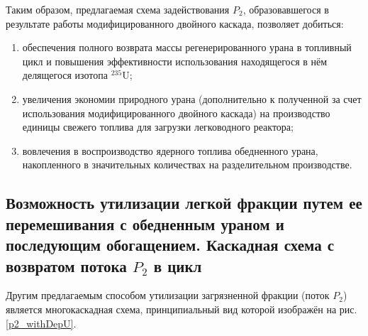 


Таким образом, предлагаемая схема задействования $P_2$, образовавшегося в результате работы модифицированного двойного каскада, позволяет добиться:
\begin{enumerate}
  \item обеспечения полного возврата массы регенерированного урана в топливный цикл и повышения эффективности использования находящегося в нём делящегося изотопа $^{235}$U;
  \item увеличения экономии природного урана (дополнительно к полученной за счет использования модифицированного двойного каскада)  на производство единицы свежего топлива для загрузки легководного реактора;
  \item вовлечения в воспроизводство ядерного топлива обедненного урана, накопленного в значительных количествах на разделительном производстве.
\end{enumerate}

\subsection{Возможность утилизации легкой фракции путем ее перемешивания с обедненным ураном и последующим обогащением. Каскадная схема с возвратом потока $P_2$ в цикл}\label{triple_c}

Другим предлагаемым способом утилизации загрязненной фракции (поток $P_2$) является многокаскадная схема, принципиальный вид которой изображён на рис. \ref{p2_withDepU}.

